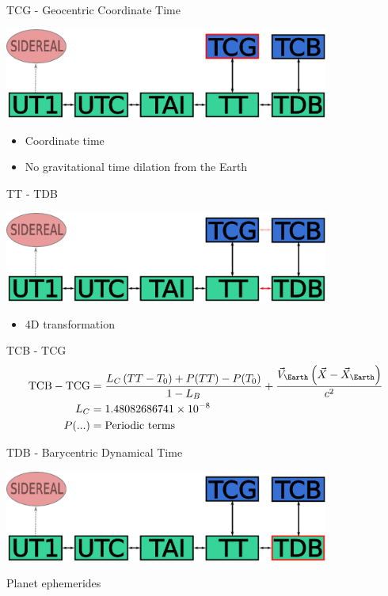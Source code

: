 \documentclass[14pt,table,t, c]{beamer}
\begin{document}
\begin{frame}{TCG - Geocentric Coordinate Time}
\begin{center}
	\includegraphics[width=0.8\textwidth]{figure/tcg}
\end{center}
\begin{itemize}
\item Coordinate time
\item No gravitational time dilation from the Earth
\end{itemize}
\end{frame}


\begin{frame}{TT - TDB}
\begin{center}
	\includegraphics[width=0.8\textwidth]{figure/tt_tdb}
\end{center}
\vspace*{-\baselineskip}
\begin{itemize}
\item 4D transformation
\end{itemize}
\begin{block}{TCB - TCG}
\footnotesize
\vspace*{-\baselineskip}\setlength\belowdisplayskip{0pt}\setlength\abovedisplayskip{0pt}
\begin{align*}
\text{TCB} - \text{TCG} &= \frac{L_C \left(TT - T_0\right) + P(TT) - P(T_0)}{1 - L_B} + 
\frac{\vec{V}_\Earth \left(\vec{X} - \vec{X}_\Earth\right)}{c^2}\\
L_C &= 1.48082686741 \times 10^{-8} \\
P(...) &= \text{Periodic terms}
\end{align*}
\end{block}
\end{frame}

\begin{frame}{TDB - Barycentric Dynamical Time}
\begin{center}
	\includegraphics[width=0.8\textwidth]{figure/tdb}
\end{center}
Planet ephemerides
\end{frame}
\end{document}
